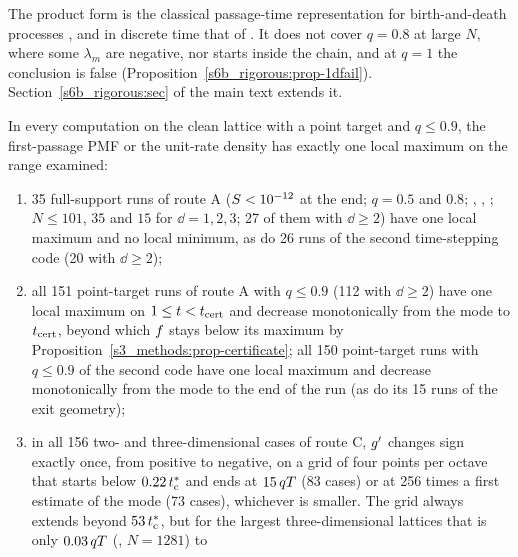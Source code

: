 The product form is the classical passage-time representation for birth-and-death processes
\citep{KarlinMcGregor1959,Keilson1971}, and in discrete time that of \citet{Fill2009}. It does not cover $q=0.8$ at
large $N$, where some $\lambda_m$ are negative, nor starts inside the chain, and at $q=1$ the conclusion is false
(Proposition~\ref{s6b_rigorous:prop-1dfail}). Section~\ref{s6b_rigorous:sec} of the main text extends it.

\begin{observation}\label{s3_methods:obs-unimodal}
In every computation on the clean lattice with a point target and $q\le0.9$, the first-passage PMF or the
unit-rate density has exactly one local maximum on the range examined:
\begin{enumerate}
\item[(a)] 35 full-support runs of route A ($S<10^{-12}$ at the end; $q=0.5$ and $0.8$; \CC, \CtM, \MtC; $N\le101$,
$35$ and $15$ for $\dd=1,2,3$; 27 of them with $\dd\ge2$) have one local maximum and no local minimum, as do 26 runs
of the second time-stepping code (20 with $\dd\ge2$);
\item[(b)] all 151 point-target runs of route A with $q\le0.9$ (112 with $\dd\ge2$) have one local maximum on
$1\le t<t_{\mathrm{cert}}$ and decrease monotonically from the mode to $t_{\mathrm{cert}}$, beyond which $f$ stays below its maximum
by Proposition~\ref{s3_methods:prop-certificate}; all 150 point-target runs with $q\le0.9$ of the second code have
one local maximum and decrease monotonically from the mode to the end of the run (as do its 15 runs of the exit
geometry);
\item[(c)] in all 156 two- and three-dimensional cases of route C, $g'$ changes sign exactly once, from positive to
negative, on a grid of four points per octave that starts below $0.22\,t^{*}_{\mathrm{c}}$ and ends at $15\,qT$
(83 cases) or at 256 times a first estimate of the mode (73 cases), whichever is smaller. The grid always extends
beyond $53\,t^{*}_{\mathrm{c}}$, but for the largest three-dimensional lattices that is only $0.03\,qT$ (\MtC, $N=1281$) to

\end{enumerate}
\end{observation}

